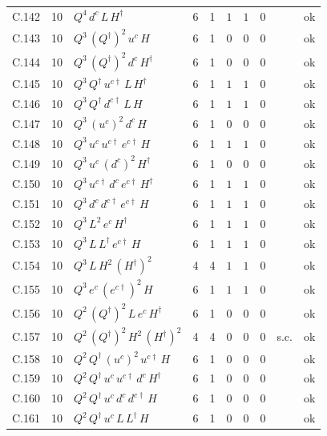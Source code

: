 {\begin{longtable}{@{}ll>{\raggedright\arraybackslash}p{6.4cm}rrllllr@{}}
C.142 & 10 & $Q^{4}\,d^c\,L\,H^\dagger$ & 6 & 1 & $1$ & $1$ & $0$ &  & ok \\
C.143 & 10 & $Q^{3}\,(Q^\dagger)^{2}\,u^c\,H$ & 6 & 1 & $0$ & $0$ & $0$ &  & ok \\
C.144 & 10 & $Q^{3}\,(Q^\dagger)^{2}\,d^c\,H^\dagger$ & 6 & 1 & $0$ & $0$ & $0$ &  & ok \\
C.145 & 10 & $Q^{3}\,Q^\dagger\,u^{c\dagger}\,L\,H^\dagger$ & 6 & 1 & $1$ & $1$ & $0$ &  & ok \\
C.146 & 10 & $Q^{3}\,Q^\dagger\,d^{c\dagger}\,L\,H$ & 6 & 1 & $1$ & $1$ & $0$ &  & ok \\
C.147 & 10 & $Q^{3}\,(u^c)^{2}\,d^c\,H$ & 6 & 1 & $0$ & $0$ & $0$ &  & ok \\
C.148 & 10 & $Q^{3}\,u^c\,u^{c\dagger}\,e^{c\dagger}\,H$ & 6 & 1 & $1$ & $1$ & $0$ &  & ok \\
C.149 & 10 & $Q^{3}\,u^c\,(d^c)^{2}\,H^\dagger$ & 6 & 1 & $0$ & $0$ & $0$ &  & ok \\
C.150 & 10 & $Q^{3}\,u^{c\dagger}\,d^c\,e^{c\dagger}\,H^\dagger$ & 6 & 1 & $1$ & $1$ & $0$ &  & ok \\
C.151 & 10 & $Q^{3}\,d^c\,d^{c\dagger}\,e^{c\dagger}\,H$ & 6 & 1 & $1$ & $1$ & $0$ &  & ok \\
C.152 & 10 & $Q^{3}\,L^{2}\,e^c\,H^\dagger$ & 6 & 1 & $1$ & $1$ & $0$ &  & ok \\
C.153 & 10 & $Q^{3}\,L\,L^\dagger\,e^{c\dagger}\,H$ & 6 & 1 & $1$ & $1$ & $0$ &  & ok \\
C.154 & 10 & $Q^{3}\,L\,H^{2}\,(H^\dagger)^{2}$ & 4 & 4 & $1$ & $1$ & $0$ &  & ok \\
C.155 & 10 & $Q^{3}\,e^c\,(e^{c\dagger})^{2}\,H$ & 6 & 1 & $1$ & $1$ & $0$ &  & ok \\
C.156 & 10 & $Q^{2}\,(Q^\dagger)^{2}\,L\,e^c\,H^\dagger$ & 6 & 1 & $0$ & $0$ & $0$ &  & ok \\
C.157 & 10 & $Q^{2}\,(Q^\dagger)^{2}\,H^{2}\,(H^\dagger)^{2}$ & 4 & 4 & $0$ & $0$ & $0$ & s.c. & ok \\
C.158 & 10 & $Q^{2}\,Q^\dagger\,(u^c)^{2}\,u^{c\dagger}\,H$ & 6 & 1 & $0$ & $0$ & $0$ &  & ok \\
C.159 & 10 & $Q^{2}\,Q^\dagger\,u^c\,u^{c\dagger}\,d^c\,H^\dagger$ & 6 & 1 & $0$ & $0$ & $0$ &  & ok \\
C.160 & 10 & $Q^{2}\,Q^\dagger\,u^c\,d^c\,d^{c\dagger}\,H$ & 6 & 1 & $0$ & $0$ & $0$ &  & ok \\
C.161 & 10 & $Q^{2}\,Q^\dagger\,u^c\,L\,L^\dagger\,H$ & 6 & 1 & $0$ & $0$ & $0$ &  & ok \\

\end{longtable}}
